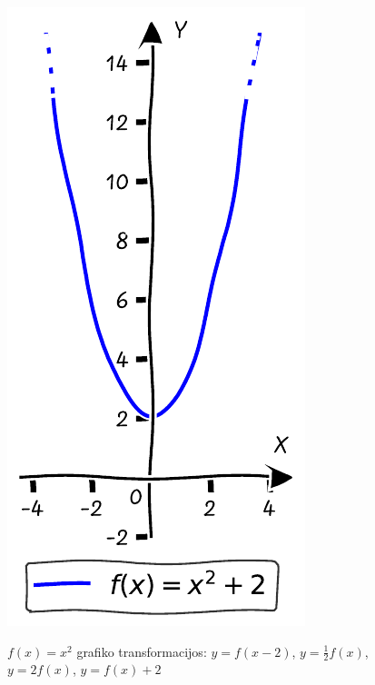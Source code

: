 \documentclass[nobib]{tufte-handout}
\begin{document}
\begin{figure}[h]
\begin{minipage}{0.19\textwidth}
    \label{fig:third}
  \end{minipage}\hfill
  \begin{minipage}{0.19\textwidth}
    \includegraphics[width=\linewidth]{./graphs/quadratic_func_ush_2.pdf}
    \label{fig:fourth}
  \end{minipage}
  \caption{$f(x)=x^2$ grafiko transformacijos: $y=f(x-2)$, $y=\frac{1}{2}f(x)$,
    $y=2f(x)$, $y=f(x)+2$ }
\end{figure}
\end{document}
